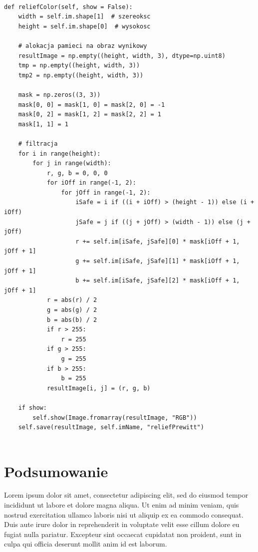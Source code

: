 \documentclass[final,a4paper,openany,12pt]{mwbk}
\begin{document}
\begin{lstlisting}[caption=Filtr płaskorzeźbowy (obraz barwny)]
	
def reliefColor(self, show = False):
	width = self.im.shape[1]  # szereoksc
	height = self.im.shape[0]  # wysokosc
	
	# alokacja pamieci na obraz wynikowy
	resultImage = np.empty((height, width, 3), dtype=np.uint8)
	tmp = np.empty((height, width, 3))
	tmp2 = np.empty((height, width, 3))
	
	mask = np.zeros((3, 3))
	mask[0, 0] = mask[1, 0] = mask[2, 0] = -1
	mask[0, 2] = mask[1, 2] = mask[2, 2] = 1
	mask[1, 1] = 1
	
	# filtracja
	for i in range(height):
		for j in range(width):
			r, g, b = 0, 0, 0
			for iOff in range(-1, 2):
				for jOff in range(-1, 2):
					iSafe = i if ((i + iOff) > (height - 1)) else (i + iOff)
					jSafe = j if ((j + jOff) > (width - 1)) else (j + jOff)
					r += self.im[iSafe, jSafe][0] * mask[iOff + 1, jOff + 1]
					g += self.im[iSafe, jSafe][1] * mask[iOff + 1, jOff + 1]
					b += self.im[iSafe, jSafe][2] * mask[iOff + 1, jOff + 1]
			r = abs(r) / 2
			g = abs(g) / 2
			b = abs(b) / 2
			if r > 255:
				r = 255
			if g > 255:
				g = 255
			if b > 255:
				b = 255
			resultImage[i, j] = (r, g, b)
	
	if show:
		self.show(Image.fromarray(resultImage, "RGB"))
	self.save(resultImage, self.imName, "reliefPrewitt")
	
\end{lstlisting}

\newpage













\newpage
\chapter{Podsumowanie}

Lorem ipsum dolor sit amet, consectetur adipiscing elit, sed do eiusmod tempor incididunt ut labore et dolore magna aliqua. Ut enim ad minim veniam, quis nostrud exercitation ullamco laboris nisi ut aliquip ex ea commodo consequat. Duis aute irure dolor in reprehenderit in voluptate velit esse cillum dolore eu fugiat nulla pariatur. Excepteur sint occaecat cupidatat non proident, sunt in culpa qui officia deserunt mollit anim id est laborum.



\end{document}
